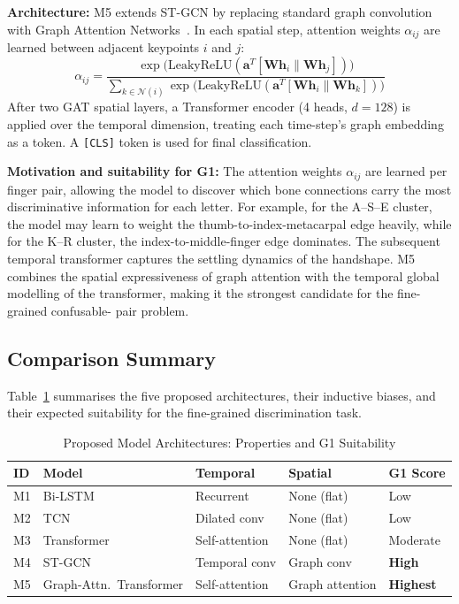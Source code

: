 \documentclass[conference]{IEEEtran}
\begin{document}
\textbf{Architecture:} M5 extends ST-GCN by replacing standard graph convolution
with Graph Attention Networks~\cite{velickovic2018gat}. In each spatial step,
attention weights $\alpha_{ij}$ are learned between adjacent keypoints $i$ and
$j$:
\begin{equation}
  \alpha_{ij} = \frac{\exp\bigl(\text{LeakyReLU}(\mathbf{a}^T
                [\mathbf{W}\mathbf{h}_i \| \mathbf{W}\mathbf{h}_j])\bigr)}
                {\sum_{k \in \mathcal{N}(i)}
                 \exp\bigl(\text{LeakyReLU}(\mathbf{a}^T
                [\mathbf{W}\mathbf{h}_i \| \mathbf{W}\mathbf{h}_k])\bigr)}
\end{equation}
After two GAT spatial layers, a Transformer encoder (4 heads, $d=128$) is applied
over the temporal dimension, treating each time-step's graph embedding as a token.
A \texttt{[CLS]} token is used for final classification.

\textbf{Motivation and suitability for G1:} The attention weights $\alpha_{ij}$
are learned per finger pair, allowing the model to discover which bone
connections carry the most discriminative information for each letter. For
example, for the A--S--E cluster, the model may learn to weight the
thumb-to-index-metacarpal edge heavily, while for the K--R cluster, the
index-to-middle-finger edge dominates. The subsequent temporal transformer
captures the settling dynamics of the handshape. M5 combines the spatial
expressiveness of graph attention with the temporal global modelling of the
transformer, making it the strongest candidate for the fine-grained confusable-
pair problem.

\subsection{Comparison Summary}

Table~\ref{tab:models} summarises the five proposed architectures, their
inductive biases, and their expected suitability for the fine-grained
discrimination task.

\begin{table}[htbp]
\caption{Proposed Model Architectures: Properties and G1 Suitability}
\label{tab:models}
\centering
\renewcommand{\arraystretch}{1.2}
\begin{tabular}{p{0.3cm} p{1.5cm} p{1.5cm} p{1.5cm} p{1.4cm}}
\toprule
\textbf{ID} & \textbf{Model} & \textbf{Temporal} & \textbf{Spatial} &
\textbf{G1 Score} \\
\midrule
M1 & Bi-LSTM         & Recurrent       & None (flat)       & Low      \\
M2 & TCN             & Dilated conv    & None (flat)       & Low      \\
M3 & Transformer     & Self-attention  & None (flat)       & Moderate \\
M4 & ST-GCN          & Temporal conv   & Graph conv        & \textbf{High}     \\
M5 & Graph-Attn.\ Transformer & Self-attention  & Graph attention   & \textbf{Highest}  \\
\bottomrule
\end{tabular}
\end{table}
\end{document}
